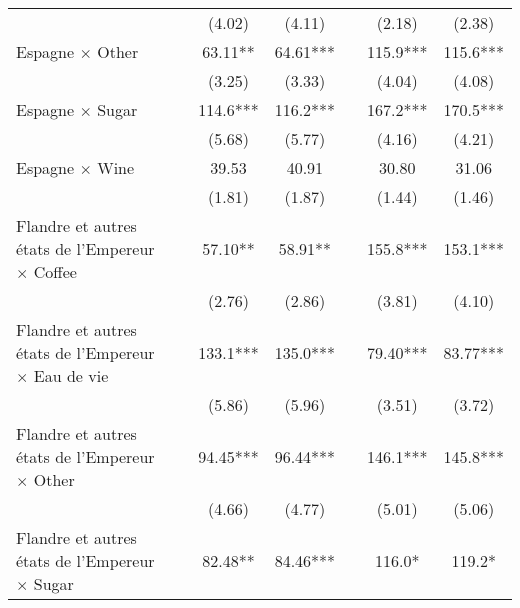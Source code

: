 {\begin{tabular}{l*{6}{c}}
                    &                     &      (4.02)         &      (4.11)         &                     &      (2.18)         &      (2.38)         \\
[1em]
Espagne $\times$ Other&                     &       63.11** &       64.61***&                     &       115.9***&       115.6***\\
                    &                     &      (3.25)         &      (3.33)         &                     &      (4.04)         &      (4.08)         \\
[1em]
Espagne $\times$ Sugar&                     &       114.6***&       116.2***&                     &       167.2***&       170.5***\\
                    &                     &      (5.68)         &      (5.77)         &                     &      (4.16)         &      (4.21)         \\
[1em]
Espagne $\times$ Wine&                     &       39.53         &       40.91         &                     &       30.80         &       31.06         \\
                    &                     &      (1.81)         &      (1.87)         &                     &      (1.44)         &      (1.46)         \\
[1em]
Flandre et autres états de l'Empereur $\times$ Coffee&                     &       57.10** &       58.91** &                     &       155.8***&       153.1***\\
                    &                     &      (2.76)         &      (2.86)         &                     &      (3.81)         &      (4.10)         \\
[1em]
Flandre et autres états de l'Empereur $\times$ Eau de vie&                     &       133.1***&       135.0***&                     &       79.40***&       83.77***\\
                    &                     &      (5.86)         &      (5.96)         &                     &      (3.51)         &      (3.72)         \\
[1em]
Flandre et autres états de l'Empereur $\times$ Other&                     &       94.45***&       96.44***&                     &       146.1***&       145.8***\\
                    &                     &      (4.66)         &      (4.77)         &                     &      (5.01)         &      (5.06)         \\
[1em]
Flandre et autres états de l'Empereur $\times$ Sugar&                     &       82.48** &       84.46***&                     &       116.0*  &       119.2*  \\

\end{tabular}}
